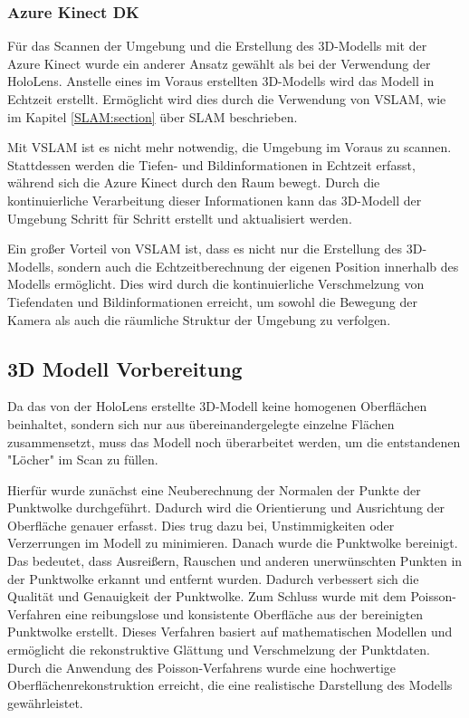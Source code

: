         \subsubsection{Azure Kinect \ac{DK}} \label{kinect:subsubsection}
        Für das Scannen der Umgebung und die Erstellung des 3D-Modells mit der Azure Kinect wurde ein anderer Ansatz gewählt als bei der Verwendung der HoloLens. Anstelle eines im Voraus erstellten 3D-Modells wird das Modell in Echtzeit erstellt. Ermöglicht wird dies durch die Verwendung von \ac{VSLAM}, wie im Kapitel \ref{SLAM:section} über \ac{SLAM} beschrieben.

        Mit \ac{VSLAM} ist es nicht mehr notwendig, die Umgebung im Voraus zu scannen. Stattdessen werden die Tiefen- und Bildinformationen in Echtzeit erfasst, während sich die Azure Kinect durch den Raum bewegt. Durch die kontinuierliche Verarbeitung dieser Informationen kann das 3D-Modell der Umgebung Schritt für Schritt erstellt und aktualisiert werden.

        Ein großer Vorteil von \ac{VSLAM} ist, dass es nicht nur die Erstellung des 3D-Modells, sondern auch die Echtzeitberechnung der eigenen Position innerhalb des Modells ermöglicht. Dies wird durch die kontinuierliche Verschmelzung von Tiefendaten und Bildinformationen erreicht, um sowohl die Bewegung der Kamera als auch die räumliche Struktur der Umgebung zu verfolgen.

    \subsection{3D Modell Vorbereitung} \label{3d_modell_vorbereitung:subsection}
    Da das von der HoloLens erstellte 3D-Modell keine homogenen Oberflächen beinhaltet, sondern sich nur aus übereinandergelegte einzelne Flächen zusammensetzt, muss das Modell noch überarbeitet werden, um die entstandenen "Löcher" im Scan zu füllen.
    
    Hierfür wurde zunächst eine Neuberechnung der Normalen der Punkte der Punktwolke durchgeführt. Dadurch wird die Orientierung und Ausrichtung der Oberfläche genauer erfasst. Dies trug dazu bei, Unstimmigkeiten oder Verzerrungen im Modell zu minimieren. Danach wurde die Punktwolke bereinigt. Das bedeutet, dass Ausreißern, Rauschen und anderen unerwünschten Punkten in der Punktwolke erkannt und entfernt wurden. Dadurch verbessert sich die Qualität und Genauigkeit der Punktwolke. Zum Schluss wurde mit dem Poisson-Verfahren eine reibungslose und konsistente Oberfläche aus der bereinigten Punktwolke erstellt. Dieses Verfahren basiert auf mathematischen Modellen und ermöglicht die rekonstruktive Glättung und Verschmelzung der Punktdaten. Durch die Anwendung des Poisson-Verfahrens wurde eine hochwertige Oberflächenrekonstruktion erreicht, die eine realistische Darstellung des Modells gewährleistet.

